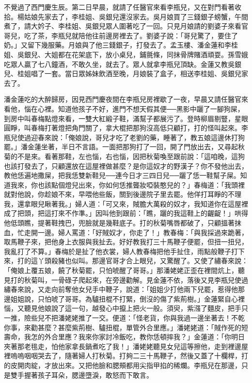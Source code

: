 不覺過了西門慶生辰。第二日早晨，就請了任醫官來看李瓶兒，又在對門看著收拾。楊姑娘先家去了，李桂姐、吳銀兒還沒家去。吳月娘買了三錢銀子螃蟹，午間煮了，請大妗子、李桂姐、吳銀兒眾人圍著吃了一回。只見月娘請的劉婆子來看官哥兒，吃了茶，李瓶兒就陪他往前邊房裡去了。劉婆子說：「哥兒驚了，要住了奶。」又留下幾服藥。月娘與了他三錢銀子，打發去了。孟玉樓、潘金蓮和李桂姐、吳銀兒、大姐都在花架底下，放小桌兒，鋪氈條，同抹骨牌賭酒頑耍。孫雪娥吃眾人贏了七八鐘酒，不敢久坐，就去了。眾人就拿李瓶兒頂缺。金蓮又教吳銀兒、桂姐唱了一套。當日眾姊妹飲酒至晚，月娘裝了盒子，相送李桂姐、吳銀兒家去了。

潘金蓮吃的大醉歸房，因見西門慶夜間在李瓶兒房裡歇了一夜，早晨又請任醫官來看他，惱在心裡。知道他孩子不好，進門不想天假其便──黑影中躧了一腳狗屎，到房中叫春梅點燈來看，一雙大紅緞子鞋，滿幫子都展污了。登時柳眉剔豎，星眼圓睜，叫春梅打著燈把角門關了，拿大棍把那狗沒高低只顧打，打的怪叫起來。李瓶兒使過迎春來說：「俺娘說，哥兒才吃了老劉的藥，睡著了，教五娘這邊休打狗罷。」潘金蓮坐著，半日不言語。一面把那狗打了一回，開了門放出去，又尋起秋菊的不是來。看著那鞋，左也惱，右也惱，因把秋菊喚至跟前說：「這咱晚，這狗也該打發去了，只顧還放在這屋裡做甚麼？是你這奴才的野漢子？你不發他出去，教他恁遍地撒屎，把我恁雙新鞋兒──連今日才三四日兒──躧了恁一鞋幫子屎。知道我來，你也該點個燈兒出來，你如何恁推聾妝啞裝憨兒的？」春梅道：「我頭裡就對他說，你趁娘不來，早喂他些飯，關到後邊院子里去罷。他佯打耳睜的不理我，還拿眼兒瞅著我。」婦人道：「可又來，賊膽大萬殺的奴才，我知道你在這屋裡成了把頭，把這打來不作準。」因叫他到跟前：「瞧，躧的我這鞋上的齷齪！」哄得他低頭瞧，提著鞋拽巴，兜臉就是幾鞋底子。打的秋菊嘴唇都破了，只顧搵著抹血，忙走開一邊。婦人罵道：「好賊奴才，你走了！」教春梅：「與我採過來跪著，取馬鞭子來，把他身上衣服與我扯去。好好教我打三十馬鞭子便罷，但扭一扭兒，我亂打了不算。」春梅於是扯了他衣裳，婦人教春梅把他手扯住，雨點般鞭子打下來，打的這丫頭殺豬也似叫。那邊官哥才合上眼兒，又驚醒了。又使了繡春來說：「俺娘上覆五娘，饒了秋菊罷，只怕唬醒了哥哥。」那潘姥姥正歪在裡間炕上，聽見打的秋菊叫，一骨碌子爬起來，在旁邊勸解。見金蓮不依，落後又見李瓶兒使過繡春來說，又走向前奪他女兒手中鞭子，說道：「姐姐少打他兩下兒罷，惹得他那邊姐姐說，只怕唬了哥哥。為驢扭棍不打緊，倒沒的傷了紫荊樹。」金蓮緊自心裡惱，又聽見他娘說了這一句，越發心中攛上把火一般。須臾，紫漒了麵皮，把手只一推，險些兒不把潘姥姥推了一交。便道：「怪老貨，你與我過一邊坐著去！不乾你事，來勸甚麼？甚麼紫荊樹、驢扭棍，單管外合里應。」潘姥姥道：「賊作死的短壽命，我怎的外合里應？我來你家討冷飯吃，教你恁頓摔我？」金蓮道：「你明日夾著那老毴走，怕他家拿長鍋煮吃了我！」潘姥姥聽見女兒這等擦他，走到裡邊屋裡嗚嗚咽咽哭去了，隨著婦人打秋菊。打夠二三十馬鞭子，然後又蓋了十欄桿，打的皮開肉綻，才放出來。又把他臉和腮頰都用尖指甲掐的稀爛。李瓶兒在那邊，只是雙手握著孩子耳朵，腮邊墮淚，敢怒而下敢言。

